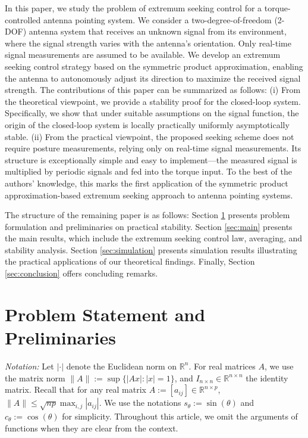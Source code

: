 \documentclass{ifacconf}
\begin{document}
In this paper, we study the problem of extremum seeking control for a torque-controlled antenna pointing system. We consider a two-degree-of-freedom (2-DOF) antenna system that receives an unknown signal from its environment, where the signal strength varies with the antenna’s orientation. Only real-time signal measurements are assumed to be available. 
We develop an extremum seeking control strategy based on the symmetric product approximation, enabling the antenna to autonomously adjust its direction to maximize the received signal strength. The contributions of this paper can be summarized as follows: (i) From the theoretical viewpoint, we provide a stability proof for the closed-loop system. Specifically, we show that under suitable assumptions on the signal function, the origin of the closed-loop system is locally practically uniformly asymptotically stable. (ii) From the practical viewpoint, the proposed seeking scheme does not require posture measurements, relying only on real-time signal measurements. Its structure is exceptionally simple and easy to implement---the measured signal is multiplied by periodic signals and fed into the torque input.
To the best of the authors' knowledge, this marks the first application of the symmetric product approximation-based extremum seeking approach to antenna pointing systems.

The structure of the remaining paper is as follows: Section \ref{sec:problem} presents problem formulation and preliminaries on practical stability. Section \ref{sec:main} presents the main results, which include the extremum seeking control law, averaging, and stability analysis. Section \ref{sec:simulation} presents simulation results illustrating the practical applications of our theoretical findings. Finally, Section \ref{sec:conclusion} offers concluding remarks.

\section{Problem Statement and Preliminaries}\label{sec:problem}

\textit{Notation:} Let $|\cdot|$ denote the Euclidean norm on $\mathbb{R}^n$. For real matrices $A$, we use the matrix norm $\|A\|:=\sup\{|Ax|: |x|=1\}$, and $I_{n\times n}\in\mathbb{R}^{n\times n}$ the identity matrix. Recall that for any real matrix $A:=[a_{ij}]\in\mathbb{R}^{n\times p}$, $\|A\|\le \sqrt{np}\max_{i,j}|a_{ij}|$. We use the notations $s_\theta:=\sin(\theta)$ and $c_\theta:=\cos(\theta)$ for simplicity. Throughout this article, we omit the arguments of functions when they are clear from the context.
\end{document}
